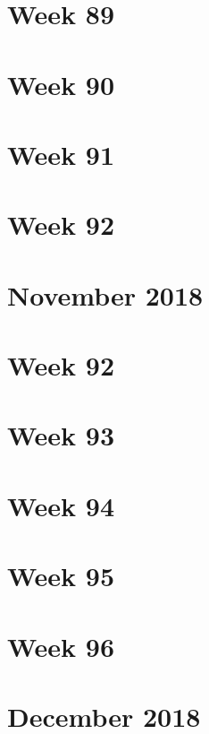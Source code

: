 \section{Week 89}\label{week-89}

\section{Week 90}\label{week-90}

\section{Week 91}\label{week-91}

\section{Week 92}\label{week-92}

\section{November 2018}\label{november-2018}

\section{Week 92}\label{week-92-1}

\section{Week 93}\label{week-93}

\section{Week 94}\label{week-94}

\section{Week 95}\label{week-95}

\section{Week 96}\label{week-96}

\section{December 2018}\label{december-2018}

